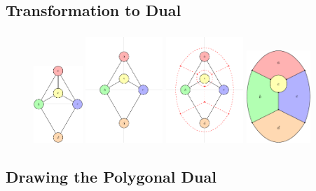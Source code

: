 \documentclass[t,18pt]{beamer}
\begin{document}
\subsection{Transformation to Dual}
\label{subsect:transformation-to-dual}

\begin{frame}[c]
  \frametitle{}
  \begin{figure}
    \includegraphics[align=c,height=2.90908cm]{../Thesis/Resources/Transformation-AugmentedDual-1.pdf}\;
    \includegraphics[align=c,height=4cm]{../Thesis/Resources/Transformation-AugmentedDual-2.pdf}\;
    \includegraphics[align=c,height=4cm]{../Thesis/Resources/Transformation-AugmentedDual-3.pdf}\;
    \includegraphics[align=c,height=3.5cm]{../Thesis/Resources/Transformation-AugmentedDual-4.pdf}
  \end{figure}
\end{frame}

\subsection{Drawing the Polygonal Dual}
\label{subsect:drawing-the-polygonal-dual}
\end{document}
